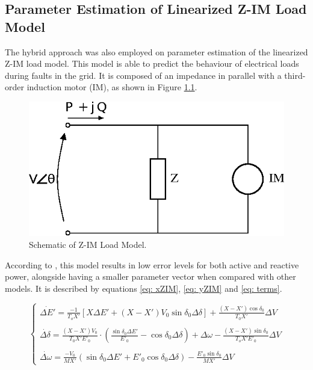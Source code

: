 
\begin{apendicesenv}
\partapendices

\chapter{Parameter Estimation of Linearized Z-IM Load Model}
\label{ch: appendix}

The hybrid approach was also employed on parameter estimation of the linearized Z-IM load model. This model is able to predict the behaviour of electrical loads during faults in the grid. It is composed of an impedance in parallel with a third-order induction motor (IM), as shown in Figure \ref{img: Z-IM}.

\begin{figure}[h]
    \caption{Schematic of Z-IM Load Model.}
    \begin{center}
    	\includegraphics[scale=1]{Images/drawZIM.eps}
    \end{center}
    \label{img: Z-IM}
\end{figure}

According to \cite{Choi}, this model results in low error levels for both active and reactive power, alongside having a smaller parameter vector when compared with other models. It is described by equations \eqref{eq: xZIM}, \eqref{eq: yZIM} and \eqref{eq: terms}.

\begin{equation}
    \begin{cases}
        \dot{\Delta E'} = \frac{-1}{T_{o}X'}[X\Delta E' + (X - X')V_{0}\sin\delta_{0}\Delta \delta] + \frac{(X - X')\cos\delta_{0}}{T_{0}X'}\Delta V \\
        \\
        \dot{\Delta \delta} = \frac{(X-X')V_{0}}{T_{0}X'E'_{0}}\cdot\left(\frac{\sin\delta_{0}\Delta E'}{E'_0} - \cos\delta_{0}\Delta\delta\right) + \Delta\omega - \frac{(X - X')\sin\delta_0}{T_o X'E'_0}\Delta V \\
        \\
        \dot{\Delta \omega} = \frac{-V_{0}}{MX'}(\sin\delta_{0}\Delta E' + E'_{0}\cos\delta_{0}\Delta\delta) - \frac{E'_0\sin\delta_0}{MX'}\Delta V
    \end{cases}
    \label{eq: xZIM}
\end{equation}


\end{apendicesenv}
